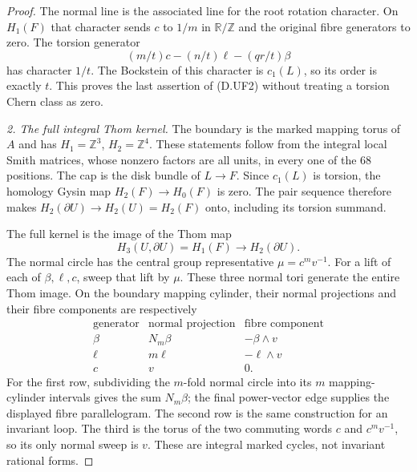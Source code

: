 \begin{proof}
The normal line is the associated line for the root rotation
character. On $H_1(F)$ that character sends $c$ to $1/m$ in
$\mathbb R/\mathbb Z$ and the original fibre generators to
zero. The torsion generator
\[
 (m/t)c-(n/t)\ell-(qr/t)\beta
\]
has character $1/t$. The Bockstein of this character is
$c_1(L)$, so its order is exactly $t$. This proves the last
assertion of (D.UF2) without treating a torsion Chern class as
zero.

\emph{2. The full integral Thom kernel.}
The boundary is the marked mapping torus of $A$ and has
$H_1=\mathbb Z^3$, $H_2=\mathbb Z^4$. These statements follow
from the integral local Smith matrices, whose nonzero factors
are all units, in every one of the $68$ positions. The cap is
the disk bundle of $L\to F$. Since $c_1(L)$ is torsion, the
homology Gysin map $H_2(F)\to H_0(F)$ is zero. The pair sequence
therefore makes $H_2(\partial U)\to H_2(U)=H_2(F)$ onto,
including its torsion summand.

The full kernel is the image of the Thom map
\[
 H_3(U,\partial U)=H_1(F)\longrightarrow H_2(\partial U).
\]
The normal circle has the central group representative
$\mu=c^m v^{-1}$. For a lift of each of $\beta,\ell,c$, sweep
that lift by $\mu$. These three normal tori generate the
entire Thom image. On the boundary mapping cylinder, their
normal projections and their fibre components are respectively
\[
\begin{array}{c|c|c}
\text{generator}&\text{normal projection}&
                          \text{fibre component}\\\hline
\beta&N_m\beta&-\beta\wedge v\\
\ell&m\ell&-\ell\wedge v\\
c&v&0.
\end{array}                                                  \tag{D.UF8}
\]
For the first row, subdividing the $m$-fold normal circle into
its $m$ mapping-cylinder intervals gives the sum $N_m\beta$;
the final power-vector edge supplies the displayed fibre
parallelogram. The second row is the same construction for an
invariant loop. The third is the torus of the two commuting
words $c$ and $c^m v^{-1}$, so its only normal sweep is $v$.
These are integral marked cycles, not invariant rational
forms.


\end{proof}
